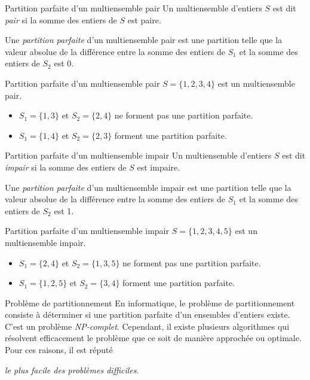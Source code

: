 \documentclass[11pt,a4paper]{article}
\begin{document}
  \begin{definition}{Partition parfaite d'un multiensemble pair}
    Un multiensemble d'entiers $S$ est dit \emph{pair} si la somme des entiers de $S$ est paire.

    Une \emph{partition parfaite} d'un multiensemble pair est une partition telle que la valeur absolue de la différence entre la somme des entiers de $S_1$ et la somme des entiers de $S_2$ est 0.
  \end{definition}

  \begin{exemple}{Partition parfaite d'un multiensemble pair}
    $S = \{1,2,3,4\}$ est un multiensemble pair.
    \begin{itemize}
      \item $S_1 = \{1,3\}$ et $S_2 = \{2,4\}$ ne forment pas une partition parfaite.
      \item $S_1 = \{1,4\}$ et $S_2 = \{2,3\}$ forment une partition parfaite.
    \end{itemize}
  \end{exemple}

  \begin{definition}{Partition parfaite d'un multiensemble impair}
    Un multiensemble d'entiers $S$ est dit \emph{impair} si la somme des entiers de $S$ est impaire.

    Une \emph{partition parfaite} d'un multiensemble impair est une partition telle que la valeur absolue de la différence entre la somme des entiers de $S_1$ et la somme des entiers de $S_2$ est 1.
  \end{definition}

  \begin{exemple}{Partition parfaite d'un multiensemble impair}
    $S = \{1,2,3,4, 5\}$ est un multiensemble impair.

    \begin{itemize}
      \item $S_1 = \{2, 4\}$ et $S_2 = \{1,3,5\}$ ne forment pas une partition parfaite.
      \item $S_1 = \{1, 2, 5\}$ et $S_2 = \{3,4\}$ forment une partition parfaite.
    \end{itemize}
  \end{exemple}

  \begin{definition}{Problème de partitionnement}
    En informatique, le problème de partitionnement consiste à déterminer si une partition parfaite d'un ensembles d'entiers existe. C'est un problème \emph{NP-complet}. Cependant, il existe plusieurs algorithmes qui résolvent efficacement le problème que ce soit de manière approchée ou optimale. Pour ces raisons, il est réputé
    \begin{center}
      \emph{le plus facile des problèmes difficiles}.
    \end{center}

\end{definition}
\end{document}
